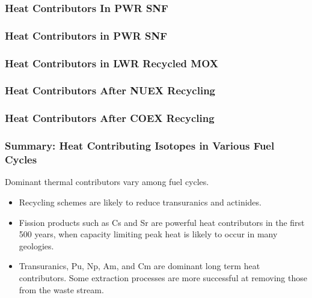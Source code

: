 
\begin{frame}[ctb!]
  \frametitle{Heat Contributors In PWR SNF}
\footnotesize{
  
}
\end{frame}

\begin{frame}[ctb!]
  \frametitle{Heat Contributors in PWR SNF}
\footnotesize{
  
}
\end{frame}
\begin{frame}[ctb!]
  \frametitle{Heat Contributors in LWR Recycled MOX}
\footnotesize{
  
}
\end{frame}
\begin{frame}[ctb!]
  \frametitle{Heat Contributors After NUEX Recycling}
\footnotesize{
  
}
\end{frame}

\begin{frame}[ctb!]
  \frametitle{Heat Contributors After COEX Recycling}
\footnotesize{
  
}
\end{frame}
\begin{frame}[ctb!]
  \frametitle{Summary: Heat Contributing Isotopes in Various Fuel Cycles}
Dominant thermal contributors vary among fuel cycles. 
\begin{itemize}
   \item Recycling schemes are likely to reduce transuranics and actinides.
   \item Fission products such as Cs and Sr are powerful heat contributors in 
     the first 500 years, when capacity limiting peak heat is likely to occur in 
     many geologies.
   \item Transuranics, Pu, Np, Am, and Cm are dominant long term heat contributors. Some extraction processes are more successful at removing those from the waste stream. 
\end{itemize}
\end{frame}
